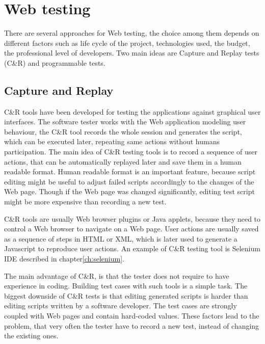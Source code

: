 	\chapter{Web testing}
	\label{ch:Webtesting}

		There are several approaches for Web testing, the choice among them depends on
		different factors such as life cycle of the project, technologies used, the
		budget, the professional level of developers. Two main ideas are Capture and
		Replay tests (C\&R) and programmable tests.
		
		\section{Capture and Replay}
		\label{sec:captureReplay}
			C\&R tools have been developed for testing the applications against graphical user interfaces. 
			The software tester works with the Web application modeling user behaviour,
			the C\&R tool records the whole session and generates the
			script, which can be executed later,	repeating same actions without humans participation.
			  The main idea of C\&R
			testing tools is to record a sequence of user actions, that can be
			automatically replayed later and save them in a human readable format. Human
			readable format is an important feature, because script editing might
			 be useful to adjust failed scripts accordingly	to the changes of the Web page.
			 Though if the Web page was changed	significantly, editing test script might be more expensive than recording a
			new test\cite{CaptureReplay7}. 
			
C\&R tools are usually Web browser plugins or Java applets, because they
need to control a Web browser to navigate on a Web page. User actions are
usually saved as a sequence of steps in HTML or XML, which is later used to
generate a Javascript to reproduce user actions. An example of C\&R testing
tool is Selenium IDE described in chapter\ref{ch:selenium}.

The main advantage of C\&R, is that the tester does not
require to have experience in coding. Building test cases with such tools
is a simple task.
The biggest downside of C\&R tests is that editing generated
scripts is harder than editing scripts written by a software
developer\cite{CaptureReplay7}. The test cases are strongly coupled with Web pages
 and contain hard-coded values. These factors lead to the
problem, that very often the tester have to record a new test, instead of
changing the existing ones.

